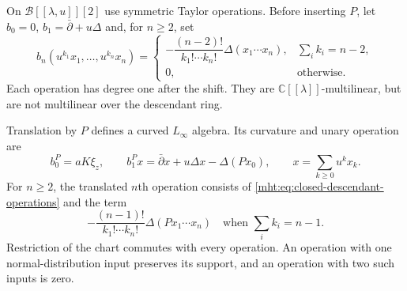 On $\mathscr B[[\lambda,u]][2]$ use symmetric Taylor
operations. Before inserting $P$, let $b_0=0$,
$b_1=\bar\partial+u\Delta$ and, for $n\geq2$, set
\begin{equation}\label{mht:eq:closed-descendant-operations}
 b_n(u^{k_1}x_1,\ldots,u^{k_n}x_n)=
 \begin{cases}
 -\dfrac{(n-2)!}{k_1!\cdots k_n!}\Delta(x_1\cdots x_n),
                  &\sum_i k_i=n-2,\\[3pt]
 0,&\text{otherwise}.
 \end{cases}
\end{equation}
Each operation has degree one after the shift.
They are $\mathbb C[[\lambda]]$-multilinear, but are not
multilinear over the descendant ring.

\begin{theorem}\label{mht:thm:one-current-curved-operations}
Translation by $P$ defines a curved $L_\infty$ algebra.
Its curvature and unary operation are
\[
 b_0^P=aK\xi_z,
 \qquad
 b_1^Px=\bar\partial x+u\Delta x-\Delta(Px_0),
 \qquad x=\sum_{k\geq0}u^kx_k.
\]
For $n\geq2$, the translated $n$th operation consists of
\eqref{mht:eq:closed-descendant-operations} and the term
\[
 -\frac{(n-1)!}{k_1!\cdots k_n!}\Delta(Px_1\cdots x_n)
       \quad\text{when }\sum_i k_i=n-1.
\]
Restriction of the chart commutes with every operation.
An operation with one normal-distribution input preserves
its support, and an operation with two such inputs is zero.
\end{theorem}
